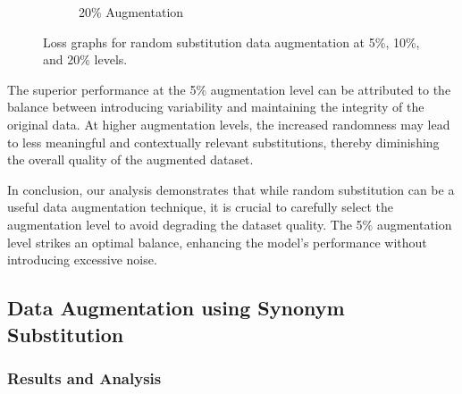 \documentclass{article}
\begin{document}
\begin{figure}[ht]
\begin{subfigure}[b]{0.3\textwidth}
    \caption{20\% Augmentation}
    \label{fig:random_20}
  \end{subfigure}
  \caption{Loss graphs for random substitution data augmentation at 5\%, 10\%, and 20\% levels.}
  \label{fig:random_substitution_loss}
\end{figure}

The superior performance at the 5\% augmentation level can be attributed to the
balance between introducing variability and maintaining the integrity of the
original data. At higher augmentation levels, the increased randomness may lead
to less meaningful and contextually relevant substitutions, thereby diminishing
the overall quality of the augmented dataset.

In conclusion, our analysis demonstrates that while random substitution can be
a useful data augmentation technique, it is crucial to carefully select the
augmentation level to avoid degrading the dataset quality. The 5\% augmentation
level strikes an optimal balance, enhancing the model's performance without
introducing excessive noise.

\subsection{Data Augmentation using Synonym Substitution}

\subsubsection{Results and Analysis}
\end{document}
